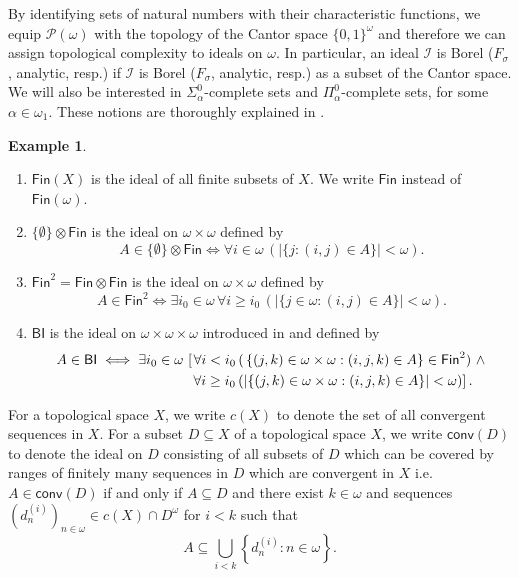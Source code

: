\documentclass{amsart}
\theoremstyle{plain}
\theoremstyle{definition}
\newtheorem{example}[theorem]{Example}
\theoremstyle{remark}
\newcommand{\cI}{\mathcal{I}}
\newcommand{\I}{\cI}
\newcommand{\cP}{\mathcal{P}}
\newcommand{\FIN}{\mathsf{Fin}}
\newcommand{\fin}{\FIN}
\newcommand{\Fin}{\FIN}
\newcommand{\conv}{\mathsf{conv}}
\newcommand{\BI}{\mathsf{BI}}
\begin{document}
By identifying sets of natural numbers with their characteristic functions,
we equip $\cP(\omega)$ with the topology of the Cantor space $\{0,1\}^\omega$ and therefore
we can assign topological complexity to ideals on $\omega$.
In particular, an ideal $\I$ is Borel ($F_\sigma$, analytic, resp.) if $\I$ is Borel ($F_\sigma$, analytic, resp.) as a subset of the Cantor space.
We will also be interested in $\Sigma^0_\alpha$-complete sets and $\Pi^0_\alpha$-complete sets, for some $\alpha\in\omega_1$. These notions are thoroughly explained in \cite{MR1321597}.


\begin{example}\  
\begin{enumerate}

 \item 
     $\fin(X)$ is  the ideal of all finite subsets of $X$.
    We  write $\fin$ instead of $\fin(\omega)$.
    

\item $\{\emptyset\} \otimes \Fin $ is the ideal on $\omega \times\omega$ defined by $$A\in \{\emptyset\}\otimes \fin \iff \forall i\in\omega \, (|\{j: (i,j)\in A\}|<\omega). $$

\item 
$\Fin^2= \Fin\otimes\Fin$ is the ideal on $\omega\times \omega$ defined by
\begin{equation*}
A\in \Fin^2 \iff \exists i_0\in\omega\, \forall i\geq i_0\, (|\{j\in\omega: (i,j)\in A\}|<\omega).
\end{equation*}

\item $\BI$ is the ideal  on $ \omega\times \omega \times\omega$
introduced in \cite[Definition~4.1]{MR4584767}
and defined by 
\begin{equation*}
    \begin{split}
A\in \BI 
\iff 
\exists i_0\in\omega\, \left[\right.
&
\forall i< i_0\, (\, \{(j,k)\in\omega\times\omega : (i,j,k)\in A\}\in \Fin^2)
\  \land 
\\&
\left.
\hspace{-3pt}\forall i\geq i_0\, (|\{(j,k)\in\omega\times\omega : (i,j,k)\in A\}|<\omega)
\right].
    \end{split}
\end{equation*}

\end{enumerate}
 \end{example}



For a  topological space $X$, 
we write $c(X)$ to denote the set of all convergent sequences in $X$.
For a subset $D\subseteq X$ of a topological space $X$, we write  $\conv(D)$ to denote 
the ideal on  $D$ consisting of all subsets of $D$ which can be covered by ranges of finitely many sequences in $D$ which are convergent in $X$ i.e.
$A\in \conv(D)$
if and only if $A\subseteq D$ and there exist $k\in \omega$ and sequences $(d^{(i)}_n)_{n\in \omega}\in c(X)\cap D^\omega$ for $i<k$ such that 
$$A \subseteq \bigcup_{i<k}\left\{d^{(i)}_n:n\in \omega\right\}.$$
\end{document}

